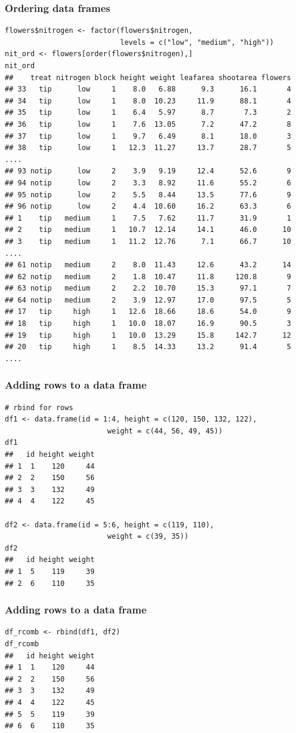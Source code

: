 \documentclass{beamer}
\newcommand{\lsting}[1]{\begin{lstlisting}[basicstyle=#1]}
\newcommand{\bfr}[1]{\begin{frame}[fragile]\frametitle{{ #1 }}}
\begin{document}
\bfr{Ordering data frames}
\lsting{\tiny}
flowers$nitrogen <- factor(flowers$nitrogen, 
                           levels = c("low", "medium", "high"))    
nit_ord <- flowers[order(flowers$nitrogen),]
nit_ord
##    treat nitrogen block height weight leafarea shootarea flowers
## 33   tip      low     1    8.0   6.88      9.3      16.1       4
## 34   tip      low     1    8.0  10.23     11.9      88.1       4
## 35   tip      low     1    6.4   5.97      8.7       7.3       2
## 36   tip      low     1    7.6  13.05      7.2      47.2       8
## 37   tip      low     1    9.7   6.49      8.1      18.0       3
## 38   tip      low     1   12.3  11.27     13.7      28.7       5
....
## 93 notip      low     2    3.9   9.19     12.4      52.6       9
## 94 notip      low     2    3.3   8.92     11.6      55.2       6
## 95 notip      low     2    5.5   8.44     13.5      77.6       9
## 96 notip      low     2    4.4  10.60     16.2      63.3       6
## 1    tip   medium     1    7.5   7.62     11.7      31.9       1
## 2    tip   medium     1   10.7  12.14     14.1      46.0      10
## 3    tip   medium     1   11.2  12.76      7.1      66.7      10
....
## 61 notip   medium     2    8.0  11.43     12.6      43.2      14
## 62 notip   medium     2    1.8  10.47     11.8     120.8       9
## 63 notip   medium     2    2.2  10.70     15.3      97.1       7
## 64 notip   medium     2    3.9  12.97     17.0      97.5       5
## 17   tip     high     1   12.6  18.66     18.6      54.0       9
## 18   tip     high     1   10.0  18.07     16.9      90.5       3
## 19   tip     high     1   10.0  13.29     15.8     142.7      12
## 20   tip     high     1    8.5  14.33     13.2      91.4       5
....
\end{lstlisting}
\end{frame}

\bfr{Adding rows to a data frame}
\lsting{\scriptsize}
# rbind for rows
df1 <- data.frame(id = 1:4, height = c(120, 150, 132, 122),
                        weight = c(44, 56, 49, 45))
df1
##   id height weight
## 1  1    120     44
## 2  2    150     56
## 3  3    132     49
## 4  4    122     45

df2 <- data.frame(id = 5:6, height = c(119, 110),
                        weight = c(39, 35))
df2
##   id height weight
## 1  5    119     39
## 2  6    110     35
\end{lstlisting}
\end{frame}

\bfr{Adding rows to a data frame}
\lsting{\scriptsize}
df_rcomb <- rbind(df1, df2)
df_rcomb
##   id height weight
## 1  1    120     44
## 2  2    150     56
## 3  3    132     49
## 4  4    122     45
## 5  5    119     39
## 6  6    110     35
\end{lstlisting}
\end{frame}
\end{document}
